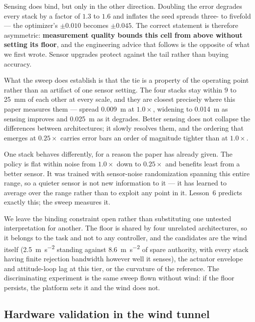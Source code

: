 Sensing does bind, but only in the other direction. Doubling the error degrades every
stack by a factor of $1.3$ to $1.6$ and inflates the seed spreads three- to fivefold ---
the optimizer's $\pm0.010$ becomes $\pm0.045$. The correct statement is therefore
asymmetric: \textbf{measurement quality bounds this cell from above without setting its
floor}, and the engineering advice that follows is the opposite of what we first wrote.
Sensor upgrades protect against the tail rather than buying accuracy.

What the sweep does establish is that the tie is a property of the operating point
rather than an artifact of one sensor setting. The four stacks stay within $9$ to
\SI{25}{\milli\meter} of each other at every scale, and they are closest precisely where
this paper measures them --- spread \SI{0.009}{\meter} at $1.0\times$, widening to
\SI{0.014}{\meter} as sensing improves and \SI{0.025}{\meter} as it degrades. Better
sensing does not collapse the differences between architectures; it slowly resolves
them, and the ordering that emerges at $0.25\times$ carries error bars an order of
magnitude tighter than at $1.0\times$.

One stack behaves differently, for a reason the paper has already given. The policy is
flat within noise from $1.0\times$ down to $0.25\times$ and benefits least from a better
sensor. It was trained with sensor-noise randomization spanning this entire range, so a
quieter sensor is not new information to it --- it has learned to average over the range
rather than to exploit any point in it. Lesson~6 predicts exactly this; the sweep
measures it.

We leave the binding constraint open rather than substituting one untested
interpretation for another. The floor is shared by four unrelated architectures, so it
belongs to the task and not to any controller, and the candidates are the wind itself
(\SI{2.5}{\meter\per\second\squared} standing against
\SI{8.6}{\meter\per\second\squared} of spare authority, with every stack having finite
rejection bandwidth however well it senses), the actuator envelope and attitude-loop lag
at this tier, or the curvature of the reference. The discriminating experiment is the
same sweep flown without wind: if the floor persists, the platform sets it and the wind
does not.

\subsection{Hardware validation in the wind tunnel}
\label{sec:results:hardware}

